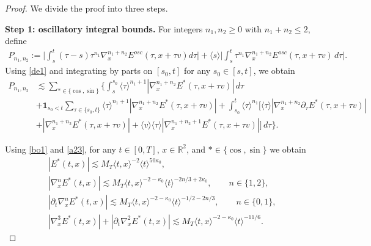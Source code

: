 \documentclass[reqno,11pt]{amsart}
\numberwithin{equation}{section}
\def\R{{\mathbb R}}
\def\R{{\bf R}}
\def\R{\mathbb{R}}
\begin{document}
\begin{proof} We divide the proof into three steps.
	\medskip
	
	\textbf{Step 1: oscillatory integral bounds.} For integers $n_1,n_2\ge0$ with $n_1+n_2\le2$, define
	\begin{align*}
		P_{n_1,n_2}	:=	\Big|\int_s^t(\tau-s) \tau^{n_1}\nabla_{x}^{n_1+n_2}E^{osc}(\tau,x+\tau v)d\tau\Big|+\langle s\rangle\Big|\int_s^t \tau^{n_1}\nabla_{x}^{n_1+n_2}E^{osc}(\tau,x+\tau v)\,d\tau\Big|.
	\end{align*}
	Using \eqref{de1} and integrating by parts on $[s_0,t]$ for any $s_0\in[s,t]$, we obtain
	\begin{equation}\label{Pbounds1}
		\begin{split}
			P_{n_1,n_2}	&\lesssim \sum_{\ast\in\{\cos,\sin\}}\Big\{\int_s^{s_0} \langle \tau\rangle^{n_1+1}|\nabla_{x}^{n_1+n_2}E^{\ast}(\tau,x+\tau v)|\,d\tau\\
			&+\mathbf 1_{s_0<t}\sum_{\tau\in\{s_0,t\}} \langle \tau\rangle^{n_1+1}|\nabla_{x}^{n_1+n_2} E^{\ast}(\tau,x+\tau v)|+\int_{s_0}^{t}\langle \tau\rangle^{n_1}\Big[\langle \tau\rangle|\nabla_{x}^{n_1+n_2}\partial_\tau E^{\ast}(\tau,x+\tau v)|\\
			&+|\nabla_{x}^{n_1+n_2} E^{\ast}(\tau,x+\tau v)|+\langle v\rangle\langle \tau\rangle|\nabla_{x}^{n_1+n_2+1} E^{\ast}(\tau,x+\tau v)|\Big]\,d\tau\Big\}.
		\end{split}
	\end{equation}
	
	Using \eqref{bo1} and \eqref{a23}, for any $t\in[0,T]$, $x\in\R^2$, and $\ast\in\{\cos,\sin\}$ we obtain
	\begin{equation}\label{Ebounds1}
		\begin{split}
			&|E^\ast(t,x)|\lesssim M_T\langle t,x\rangle^{-2}\langle t\rangle^{50\kappa_0},\\
			&|\nabla_x^n E^\ast(t,x)|\lesssim M_T\langle t,x\rangle^{-2-\kappa_0}\langle t\rangle^{-2n/3+2\kappa_0},\qquad n\in\{1,2\},\\
			&|\partial_t\nabla_x^n E^\ast(t,x)|\lesssim M_T\langle t,x\rangle^{-2-\kappa_0}\langle t\rangle^{-1/2-2n/3},\qquad n\in\{0,1\},\\
			&|\nabla_x^3 E^\ast(t,x)|+|\partial_t\nabla_x^2 E^\ast(t,x)|\lesssim M_T\langle t,x\rangle^{-2-\kappa_0}\langle t\rangle^{-11/6}.
		\end{split}
	\end{equation}
	

\end{proof}
\end{document}
